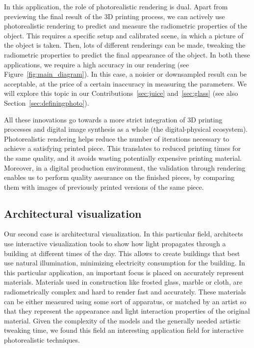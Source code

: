In this application, the role of photorealistic rendering is dual. Apart from previewing the final result of the 3D printing process, we can actively use photorealistic rendering to predict and measure the radiometric properties of the object. This requires a  specific setup and calibrated scene, in which a picture of the object is taken. Then, lots of different renderings can be made, tweaking the radiometric properties to predict the final appearance of the object. In both these applications, we require a high accuracy in our rendering (see Figure~\ref{fig:main_diagram}). In this case, a noisier or downsampled result can be acceptable, at the price of a certain inaccuracy in measuring the parameters. We will explore this topic in our Contributions~\ref{sec:juice} and~\ref{sec:glass} (see also Section~\ref{sec:definingphoto}).

All these innovations go towards a more strict integration of 3D printing processes and digital image synthesis as a whole (the digital-physical ecosystem). Photorealistic rendering helps reduce the number of iterations necessary to achieve a satisfying printed piece. This translates to reduced printing times for the same quality, and it avoids wasting potentially expensive printing material. Moreover, in a digital production  environment, the validation through rendering enables us to perform quality assurance on the finished pieces, by comparing them with images of previously printed versions of the same piece.

\subsection{Architectural visualization}

Our second case is architectural visualization. In this particular field, architects use interactive visualization tools to show how light propagates through a building at different times of the day. This allows to create buildings that best use natural illumination, minimizing electricity consumption for the building. In this particular application, an important focus is placed on accurately represent materials. Materials used in construction like frosted glass, marble or cloth, are radiometrically complex and hard to render fast and accurately. These materials can be either measured using some sort of apparatus, or matched by an artist so that they represent the appearance and light interaction properties of the original material. Given the complexity of the models and the generally needed artistic tweaking time, we found this field an interesting application field for interactive photorealistic techniques.


